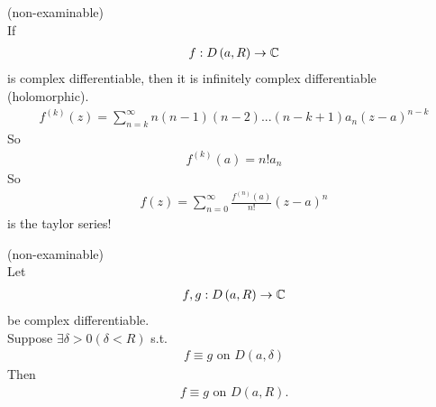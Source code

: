 \documentclass[a4paper]{article}
\begin{document}
\begin{coro}(non-examinable)\\
If
\begin{equation*}
\begin{aligned}
f: D\left(a,R\right) \to \mathbb{C}
\end{aligned}
\end{equation*}
is complex differentiable, then it is infinitely complex differentiable (holomorphic).\\
\begin{equation*}
\begin{aligned}
f^{\left(k\right)} \left(z\right) = \sum_{n=k}^\infty n\left(n-1\right)\left(n-2\right) ... \left(n-k+1\right) a_n \left(z-a\right)^{n-k}
\end{aligned}
\end{equation*}
So
\begin{equation*}
\begin{aligned}
f^{\left(k\right)} \left(a\right) = n! a_n
\end{aligned}
\end{equation*}
So
\begin{equation*}
\begin{aligned}
f\left(z\right) = \sum_{n=0}^\infty \frac{f^{\left(n\right)} \left(a\right)}{n!}\left(z-a\right)^n
\end{aligned}
\end{equation*}
is the taylor series!
\end{coro}

\begin{coro}(non-examinable)\\
Let
\begin{equation*}
\begin{aligned}
f,g: D\left(a,R\right) \to \mathbb{C}
\end{aligned}
\end{equation*}
be complex differentiable.\\
Suppose $\exists \delta > 0\left(\delta < R\right)$ s.t.
\begin{equation*}
\begin{aligned}
f \equiv g \text{  on  } D\left(a,\delta\right)
\end{aligned}
\end{equation*}
Then
\begin{equation*}
\begin{aligned}
f \equiv g \text{  on  } D\left(a,R\right).
\end{aligned}
\end{equation*}
\end{coro}
\end{document}
